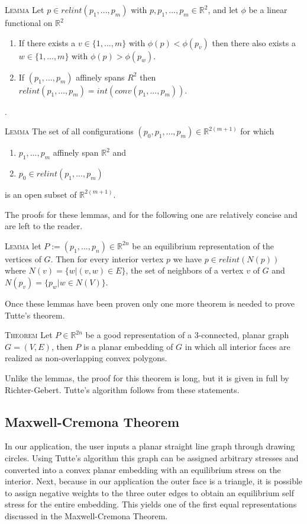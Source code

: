 \documentclass[11pt]{article}
\newcommand{\R}{\mathbb{R}}
\theoremstyle{definition}
\begin{document}
\textsc{Lemma} Let $p \in relint(p_1,...,p_m)$ with $p, p_1,...,p_m \in \R^2$, and let $\phi$ be a linear functional on $\R^2$
	\begin{enumerate}
		\item If there exists a $v \in \{1,...,m\}$ with $\phi(p) < \phi(p_v)$ then there also exists a $w \in \{1,...,m\}$ with $\phi(p) > \phi(p_w)$.
		\item If $(p_1,...,p_m)$ affinely spans $R^2$ then $relint(p_1,...,p_m) = int(conv(p_1,...,p_m))$.
	\end{enumerate} .

\textsc{Lemma} The set of all configurations $(p_0, p_1,...,p_m) \in \R^{2(m+1)}$ for which 
	\begin{enumerate}
		\item $p_1,...,p_m$ affinely span $\R^2$ and
		\item $p_0 \in relint(p_1,...,p_m)$
	\end{enumerate}
	is an open subset of $\R^{2(m+1)}$.

The proofs for these lemmas, and for the following one are relatively concise and are left to the reader.

\textsc{Lemma} let $P:=(p_1,...,p_n) \in \R^{2n}$ be an equilibrium representation of the vertices of $G$. Then for every interior vertex $p$ we have $p \in relint(N(p))$ where $N(v) = \{w | (v,w) \in E\}$, the set of neighbors of a vertex $v$ of $G$ and $N(p_v) = \{p_w | w \in N(V)\}$.

Once these lemmas have been proven only one more theorem is needed to prove Tutte's theorem.

\textsc{Theorem} Let $P \in \R^{2n}$ be a good representation of a 3-connected, planar graph $G = (V,E)$, then $P$ is a planar embedding of $G$ in which all interior faces are realized as non-overlapping convex polygons.

Unlike the lemmas, the proof for this theorem is long, but it is given in full by Richter-Gebert. Tutte's algorithm follows from these statements.

\subsection{Maxwell-Cremona Theorem}
In our application, the user inputs a planar straight line graph through drawing circles. Using Tutte's algorithm this graph can be assigned arbitrary stresses and converted into a convex planar embedding with an equilibrium stress on the interior. Next, because in our application the outer face is a triangle, it is possible to assign negative weights to the three outer edges to obtain an equilibrium self stress for the entire embedding. This yields one of the first equal representations discussed in the Maxwell-Cremona Theorem.
\end{document}
